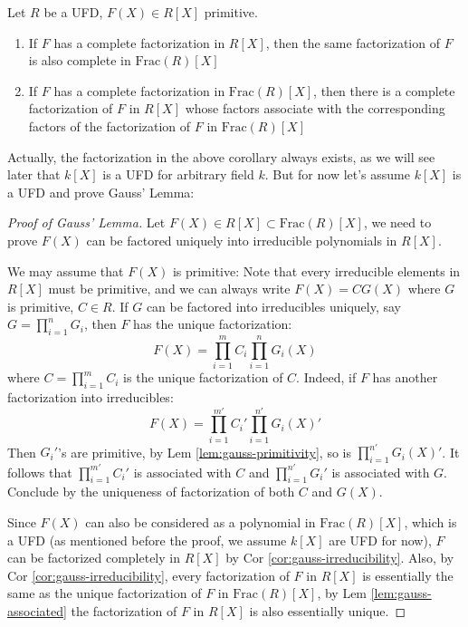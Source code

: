 \documentclass{note-eng}
\begin{document}
\begin{corollary} \label{cor:gauss-irreducibility}
    Let $R$ be a UFD, $F(X) \in R[X]$ primitive.
    \begin{enumerate}
        \item If $F$ has a complete factorization in $R[X]$, then the same factorization of $F$ is also complete in $\mathrm{Frac}(R)[X]$
        \item If $F$ has a complete factorization in $\mathrm{Frac}(R)[X]$, then there is a complete factorization of $F$ in $R[X]$ whose factors associate with the corresponding factors of the factorization of $F$ in $\mathrm{Frac}(R)[X]$
    \end{enumerate}
\end{corollary}

Actually, the factorization in the above corollary always exists, as we will see later that $k[X]$ is a UFD for arbitrary field $k$. But for now let's assume $k[X]$ is a UFD and prove Gauss' Lemma:

\begin{proof}[Proof of Gauss' Lemma]
    Let $F(X) \in R[X] \subset \mathrm{Frac}(R)[X]$, we need to prove $F(X)$ can be factored uniquely into irreducible polynomials in $R[X]$.
    
    We may assume that $F(X)$ is primitive: Note that every irreducible elements in $R[X]$ must be primitive, and we can always write $F(X) = CG(X)$ where $G$ is primitive, $C \in R$. If $G$ can be factored into irreducibles uniquely, say $G = \prod\limits_{i = 1}^{n} G_i$, then $F$ has the unique factorization:
    $$F(X) = \prod\limits_{i = 1}^{m} C_i \prod\limits_{i = 1}^{n} G_i(X)$$
    where $C = \prod\limits_{i = 1}^{m} C_i$ is the unique factorization of $C$. Indeed, if $F$ has another factorization into irreducibles:
    $$F(X) = \prod\limits_{i = 1}^{m'} C_i' \prod\limits_{i = 1}^{n'} G_i(X)'$$
    Then $G_i'$'s are primitive, by Lem \ref{lem:gauss-primitivity}, so is $\prod\limits_{i = 1}^{n'} G_i(X)'$. It follows that $\prod\limits_{i = 1}^{m'} C_i'$ is associated with $C$ and $\prod\limits_{i = 1}^{n'} G_i'$ is associated with $G$. Conclude by the uniqueness of factorization of both $C$ and $G(X)$.
    
    Since $F(X)$ can also be considered as a polynomial in $\mathrm{Frac}(R)[X]$, which is a UFD (as mentioned before the proof, we assume $k[X]$ are UFD for now), $F$ can be factorized completely in $R[X]$ by Cor \ref{cor:gauss-irreducibility}. Also, by Cor \ref{cor:gauss-irreducibility}, every factorization of $F$ in $R[X]$ is essentially the same as the unique factorization of $F$ in $\mathrm{Frac}(R)[X]$, by Lem \ref{lem:gauss-associated} the factorization of $F$ in $R[X]$ is also essentially unique.
\end{proof}
\end{document}
